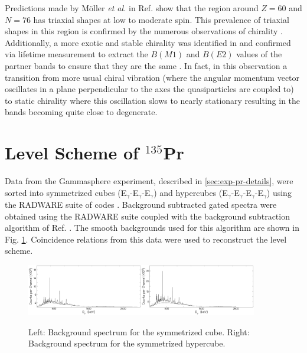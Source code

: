Predictions made by M\"oller \emph{et al.} in Ref. \cite{groundStateTriax} show that the region around $Z=60$ and $N=76$ has triaxial shapes at low to moderate spin. This prevalence of triaxial shapes in this region is confirmed by the numerous observations of chirality \cite{chiralityIn134Pr,chiralityA130Region,chiralityA130Region2,chiralityUpperA130Region,chirality136Pm,chiralityMore135Nd,chiralityMulti133Cs,chiralityMore135Nd}. Additionally, a more exotic and stable chirality was identified in \cite{chiralityMore135Nd} and confirmed via lifetime measurement to extract the $B(M1)$ and $B(E2)$ values of the partner bands to ensure that they are the same \cite{chiralityIn135Nd}. In fact, in this observation a transition from more usual chiral vibration (where the angular momentum vector oscillates in a plane perpendicular to the axes the quasiparticles are coupled to) to static chirality where this oscillation slows to nearly stationary resulting in the bands becoming quite close to degenerate.

\section{Level Scheme of $^{135}$Pr}
\label{sec:trw-lvl-scheme}
Data from the Gammasphere experiment, described in \ref{sec:exp-pr-details}, were sorted into symmetrized cubes (E$_{\gamma{}}$-E$_{\gamma{}}$-E$_{\gamma{}}$) and hypercubes (E$_{\gamma{}}$-E$_{\gamma{}}$-E$_{\gamma{}}$-E$_{\gamma{}}$) using the RADWARE suite of codes \cite{radware}. Background subtracted gated spectra were obtained using the RADWARE suite coupled with the background subtraction algorithm of Ref. \cite{symBGSub}. The smooth backgrounds used for this algorithm are shown in Fig. \ref{fig:chp4-bg-specs}. Coincidence relations from this data were used to reconstruct the level scheme.
\begin{figure}[bh!]
\centerline{\includegraphics[width=0.45\textwidth]{./img/c4/trips_bg.pdf}\includegraphics[width=0.45\textwidth]{./img/c4/quads_bg.pdf}}
	\caption{Left: Background spectrum for the symmetrized cube. Right: Background spectrum for the symmetrized hypercube. \label{fig:chp4-bg-specs}}
\end{figure}

